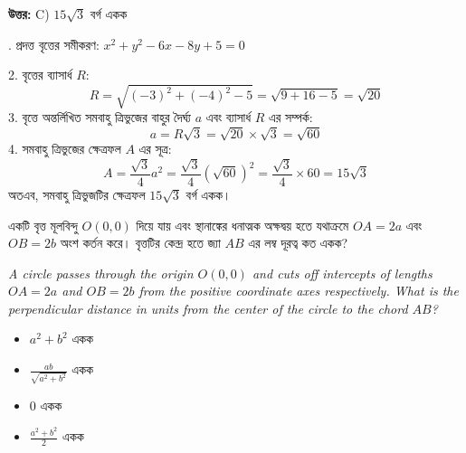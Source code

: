 \documentclass[12pt, a4paper]{article}
\begin{document}
\vspace{0.5em}
\begin{tcolorbox}[answerbox]
    \textbf{\color{success} উত্তর:} C) $15\sqrt{3}$ বর্গ একক
\end{tcolorbox}
\vspace{1em}

\begin{tcolorbox}[solutionbox={সমাধান (Solution)}]
    . প্রদত্ত বৃত্তের সমীকরণ: $x^2 + y^2 - 6x - 8y + 5 = 0$
    
    \vspace{0.5em}
    2. বৃত্তের ব্যাসার্ধ $R$:
    \[ R = \sqrt{(-3)^2 + (-4)^2 - 5} = \sqrt{9 + 16 - 5} = \sqrt{20} \]
    3. বৃত্তে অন্তর্লিখিত সমবাহু ত্রিভুজের বাহুর দৈর্ঘ্য $a$ এবং ব্যাসার্ধ $R$ এর সম্পর্ক:
    \[ a = R\sqrt{3} = \sqrt{20} \times \sqrt{3} = \sqrt{60} \]
    4. সমবাহু ত্রিভুজের ক্ষেত্রফল $A$ এর সূত্র:
    \[ A = \frac{\sqrt{3}}{4} a^2 = \frac{\sqrt{3}}{4} (\sqrt{60})^2 = \frac{\sqrt{3}}{4} \times 60 = 15\sqrt{3} \]
    অতএব, সমবাহু ত্রিভুজটির ক্ষেত্রফল $15\sqrt{3}$ বর্গ একক।
\end{tcolorbox}

\begin{tcolorbox}[questionbox={প্রশ্ন (Question) 18}]
    \noindent
    একটি বৃত্ত মূলবিন্দু $O(0, 0)$ দিয়ে যায় এবং স্থানাঙ্কের ধনাত্মক অক্ষদ্বয় হতে যথাক্রমে $OA = 2a$ এবং $OB = 2b$ অংশ কর্তন করে। বৃত্তটির কেন্দ্র হতে জ্যা $AB$ এর লম্ব দূরত্ব কত একক?
    
    \vspace{0.8em}
    \begin{english}
    \noindent\textit{\color{darkgray}
    A circle passes through the origin $O(0, 0)$ and cuts off intercepts of lengths $OA = 2a$ and $OB = 2b$ from the positive coordinate axes respectively. What is the perpendicular distance in units from the center of the circle to the chord $AB$?
    }
    \end{english}
\end{tcolorbox}

\begin{itemize}[label={}, leftmargin=1cm, itemsep=0.5em]
    \item[\textbf{A)}] $a^2 + b^2$ একক
    \item[\textbf{B)}] $\frac{ab}{\sqrt{a^2 + b^2}}$ একক
    \item[\textbf{C)}] $0$ একক
    \item[\textbf{D)}] $\frac{a^2 + b^2}{2}$ একক
\end{itemize}
\end{document}
